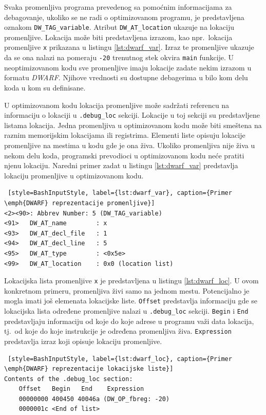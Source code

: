 \documentclass[12pt,oneside]{memoir}
\begin{document}
Svaka promenljiva programa prevedenog sa pomoćnim informacijama za debagovanje, ukoliko se ne radi o optimizovanom programu, je predstavljena oznakom \texttt{DW\_TAG\_variable}. Atribut \texttt{DW\_AT\_location} ukazuje na lokaciju promenljive. Lokacija može biti predstavljena izrazom, kao npr.~lokacija promenljive \texttt{x} prikazana u listingu \ref{lst:dwarf_var}. Izraz te promenljive ukazuje da se ona nalazi na pomeraju \texttt{-20} trenutnog stek okvira \texttt{main} funkcije. U neoptimizovanom kodu sve promenljive imaju lokacije zadate nekim izrazom u formatu \emph{DWARF}. Njihove vrednosti su dostupne debagerima u bilo kom delu koda u kom su definisane.

U optimizovanom kodu lokacija promenljive može sadržati referencu na informaciju o lokaciji u \texttt{.debug\_loc} sekciji. Lokacije u toj sekciji su predstavljene listama lokacija. Jedna promenljiva u optimizovanom kodu može biti smeštena na raznim memorijskim lokacijama ili registrima. Elementi liste opisuju lokacije promenljive na mestima u kodu gde je ona živa. Ukoliko promenljiva nije živa u nekom delu koda, programski prevodioci u optimizovanom kodu neće pratiti njenu lokaciju. Naredni primer zadat u listingu \ref{lst:dwarf_var} predstavlja lokaciju promenljive u optimizovanom kodu.

\begin{lstlisting} [style=BashInputStyle, label={lst:dwarf_var}, caption={Primer \emph{DWARF} reprezentacije promenljive}]
<2><90>: Abbrev Number: 5 (DW_TAG_variable)
<91>   DW_AT_name        : x
<93>   DW_AT_decl_file   : 1
<94>   DW_AT_decl_line   : 5
<95>   DW_AT_type        : <0x5e>
<99>   DW_AT_location    : 0x0 (location list)
\end{lstlisting}

Lokacijska lista promenljive \texttt{x} je predstavljena u listingu \ref{lst:dwarf_loc}. U ovom konkretnom primeru, promenljiva živi samo na jednom mestu. Potencijalno je mogla imati još elemenata lokacijske liste. \texttt{Offset} predstavlja informaciju gde se lokacijska lista određene promenljive nalazi u \texttt{.debug\_loc} sekciji. \texttt{Begin} i \texttt{End} predstavljaju informaciju od koje do koje adrese u programu važi data lokacija, tj.~od koje do koje instrukcije je određena promenljiva živa. \texttt{Expression} predstavlja izraz koji opisuje lokaciju promenljive.

\begin{lstlisting} [style=BashInputStyle, label={lst:dwarf_loc}, caption={Primer \emph{DWARF} reprezentacije lokacijske liste}]
Contents of the .debug_loc section:
	Offset   Begin   End    Expression
	00000000 400450 40046a (DW_OP_fbreg: -20)
	0000001c <End of list>
\end{lstlisting}
\end{document}

